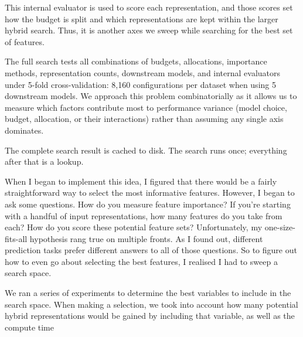 This internal evaluator is used to score each representation, and those scores set how the budget is split and which representations are kept within the larger hybrid search. Thus, it is another axes we sweep while searching for the best set of features.



The full search tests all combinations of budgets, allocations, importance methods, representation counts, downstream models, and internal evaluators under 5-fold cross-validation: 8,160 configurations per dataset when using 5 downstream models. We approach this problem combinatorially as it allows us to measure which factors contribute most to performance variance (model choice, budget, allocation, or their interactions) rather than assuming any single axis dominates.


The complete search result is cached to disk. The search runs once; everything after that is a lookup.

When I began to implement this idea, I figured that there would be a fairly straightforward way to select the most informative features. However, I began to ask some questions. How do you measure feature importance? If you're starting with a handful of input representations, how many features do you take from each? How do you score these potential feature sets?  Unfortunately, my one-size-fits-all hypothesis rang true on multiple fronts. As I found out, different prediction tasks prefer different answers to all of those questions. So to figure out how to even go about selecting the best features, I realised I had to sweep a search space.

We ran a series of experiments to determine the best variables to include in the search space.
When making a selection, we took into account how many potential hybrid representations would be gained by including that variable, as well as the compute time


